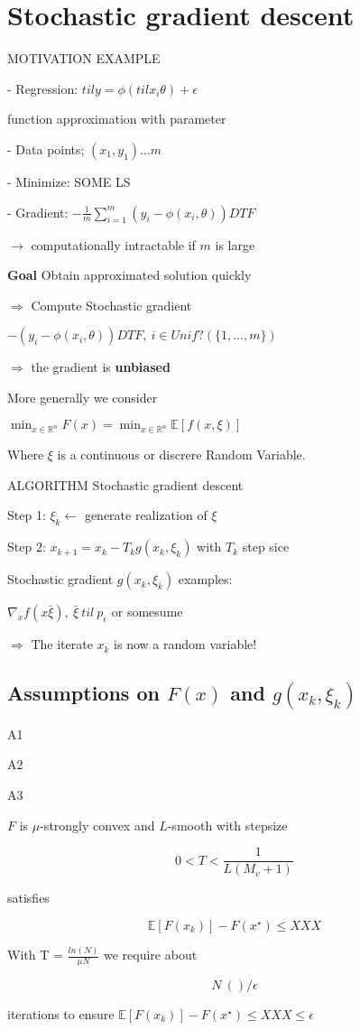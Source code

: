 \section{Stochastic gradient descent}

MOTIVATION EXAMPLE

- Regression: $til y=\phi(til x_i\theta) + \epsilon$

\phi function approximation with parameter \theta

- Data points; $(x_1,y_1)\dots m$ %

- Minimize: SOME LS

- Gradient: $-\frac{1}{m} \sum_{i=1}^{m}(y_i-\phi(x_i,\theta))DTF$ %

$\rightarrow$ computationally intractable if $m$ is large

\textbf{Goal}
Obtain approximated solution quickly

$\Rightarrow$ Compute Stochastic gradient

$-(y_i - \phi(x_i,\theta)) DTF,\ i \in Unif?(\{1,...,m\})$

$\Rightarrow$ the gradient is \textbf{unbiased}

More generally we consider

$\min _{x \in \mathbb{R}^{n}} F(x) = \min _{x \in \mathbb{R}^{n}} \mathbb{E} [f(x,\xi)]$

Where $\xi$ is a continuous or discrere Random Variable.

ALGORITHM Stochastic gradient descent

Step 1: $\xi_k \leftarrow$ generate realization of $\xi$

Step 2: $x_{k+1} = x_k - T_k  g(x_k,\xi_k)$ with $T_k$ step sice

Stochastic gradient $g(x_k,\xi_k)$ examples:

$\nabla_xf(x\bar{\xi}),\ \bar{\xi}\ til\ p_\epsilon$ or somesume %

$\Rightarrow$ The iterate $x_k$ is now a random variable!

\subsection{Assumptions on $F(x)$ and $g(x_k,\xi_k)$}

A1

A2

A3

\begin{proposition}
	$F$ is $\mu$-strongly convex and $L$-smooth with stepsize

	$$0<T<\displaystyle\frac{1}{L(M_v + 1)}$$

	satisfies

	$$\mathbb{E} [F(x_k)] - F(x^\star)\le XXX$$

	With T = $\frac{ln(N)}{\mu N}$ we require about

	$$ N ~  ()/\epsilon$$

	iterations to ensure $\mathbb{E} [F(x_k)] - F(x^\star)\le XXX \le \epsilon$
\end{proposition}

